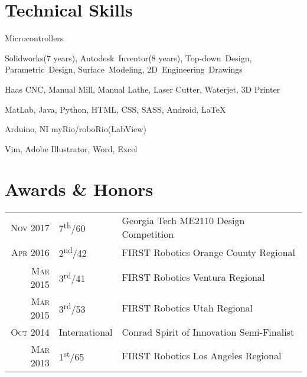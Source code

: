 \documentclass{resume}
\begin{document}

\section{Technical Skills}
\begin{skills}{Microcontrollers}
  \item [CAD] Solidworks(7 years), Autodesk~Inventor(8 years), Top-down~Design, Parametric~Design, Surface~Modeling, 2D~Engineering~Drawings
  \item [Manufacturing] Haas CNC, Manual Mill, Manual Lathe, Laser Cutter, Waterjet, 3D Printer
  \item [Programming] MatLab, Java, Python, HTML, CSS, SASS, Android, \LaTeX
  \item [Microcontrollers] Arduino, NI myRio/roboRio(LabView)
  \item [Software] Vim, Adobe Illustrator, Word, Excel
\end{skills}

\section{Awards \& Honors}
\begin{tabular}{rll}
  \textsc{Nov} 2017 & 7\textsuperscript{th}/60 & Georgia Tech ME2110 Design Competition\\
  \textsc{Apr} 2016 & 2\textsuperscript{nd}/42 & FIRST Robotics Orange County Regional\\
  \textsc{Mar} 2015 & 3\textsuperscript{rd}/41 & FIRST Robotics Ventura Regional\\
  \textsc{Mar} 2015 & 3\textsuperscript{rd}/53 & FIRST Robotics Utah Regional\\
  \textsc{Oct} 2014 & International & Conrad Spirit of Innovation Semi-Finalist\\
  \textsc{Mar} 2013 & 1\textsuperscript{st}/65 & FIRST Robotics Los Angeles Regional\\
\end{tabular}
\end{document}
